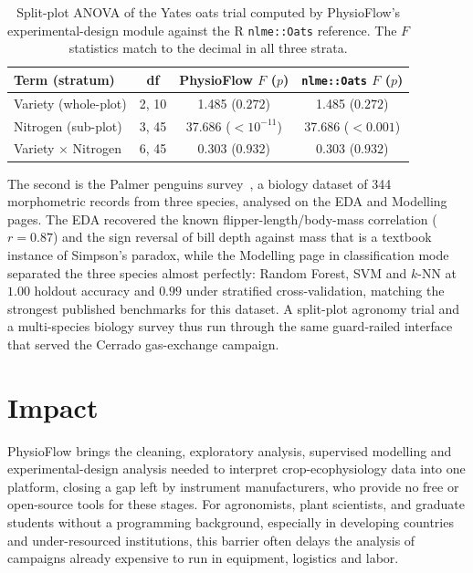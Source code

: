 \documentclass[preprint,12pt,a4paper]{elsarticle}
\begin{document}
\begin{table}[!h]
\centering
\footnotesize
\begin{tabular}{lccc}
\toprule
\textbf{Term (stratum)} & \textbf{df} & \textbf{PhysioFlow $F$ ($p$)} & \textbf{\texttt{nlme::Oats} $F$ ($p$)} \\
\midrule
Variety (whole-plot)      & 2, 10 & 1.485 ($0.272$)        & 1.485 ($0.272$) \\
Nitrogen (sub-plot)       & 3, 45 & 37.686 ($<10^{-11}$)   & 37.686 ($<0.001$) \\
Variety $\times$ Nitrogen & 6, 45 & 0.303 ($0.932$)        & 0.303 ($0.932$) \\
\bottomrule
\end{tabular}
\caption{Split-plot ANOVA of the Yates oats trial computed by PhysioFlow's experimental-design module against the R \texttt{nlme::Oats} reference. The $F$ statistics match to the decimal in all three strata.}\label{tbl:oats}
\end{table}

The second is the Palmer penguins survey~\cite{Gorman2014}, a biology dataset of 344 morphometric records from three species, analysed on the EDA and Modelling pages. The EDA recovered the known flipper-length/body-mass correlation ($r=0.87$) and the sign reversal of bill depth against mass that is a textbook instance of Simpson's paradox, while the Modelling page in classification mode separated the three species almost perfectly: Random Forest, SVM and $k$-NN at $1.00$ holdout accuracy and $0.99$ under stratified cross-validation, matching the strongest published benchmarks for this dataset. A split-plot agronomy trial and a multi-species biology survey thus run through the same guard-railed interface that served the Cerrado gas-exchange campaign.

\section{Impact}\label{sec:impact}

PhysioFlow brings the cleaning, exploratory analysis, supervised modelling and experimental-design analysis needed to interpret crop-ecophysiology data into one platform, closing a gap left by instrument manufacturers, who provide no free or open-source tools for these stages. For agronomists, plant scientists, and graduate students without a programming background, especially in developing countries and under-resourced institutions, this barrier often delays the analysis of campaigns already expensive to run in equipment, logistics and labor.
\end{document}
